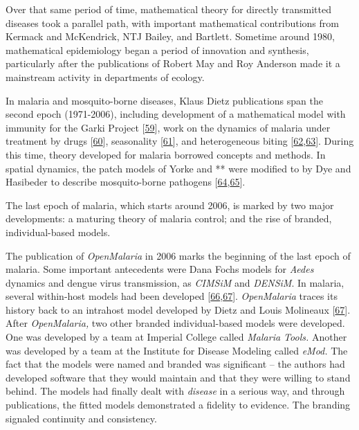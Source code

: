 \documentclass[
]{book}
\begin{document}
Over that same period of time, mathematical theory for directly transmitted diseases took a parallel path, with important mathematical contributions from Kermack and McKendrick, NTJ Bailey, and Bartlett. Sometime around 1980, mathematical epidemiology began a period of innovation and synthesis, particularly after the publications of Robert May and Roy Anderson made it a mainstream activity in departments of ecology.

In malaria and mosquito-borne diseases, Klaus Dietz publications span the second epoch (1971-2006), including development of a mathematical model with immunity for the Garki Project {[}\protect\hyperlink{ref-DietzK1974GarkiModel}{59}{]}, work on the dynamics of malaria under treatment by drugs {[}\protect\hyperlink{ref-DietzK1975ModelsParasitic}{60}{]}, seasonality {[}\protect\hyperlink{ref-DietzK1976Seasonality}{61}{]}, and heterogeneous biting {[}\protect\hyperlink{ref-DietzK1980ModelsVectorborne}{62},\protect\hyperlink{ref-DietzK1988EpidemiologicalModels}{63}{]}. During this time, theory developed for malaria borrowed concepts and methods. In spatial dynamics, the patch models of Yorke and ** were modified to by Dye and Hasibeder to describe mosquito-borne pathogens {[}\protect\hyperlink{ref-DyeC1986PopulationDynamics}{64},\protect\hyperlink{ref-HasibederG1988PopulationDynamics}{65}{]}.

The last epoch of malaria, which starts around 2006, is marked by two major developments: a maturing theory of malaria control; and the rise of branded, individual-based models.

The publication of \emph{OpenMalaria} in 2006 marks the beginning of the last epoch of malaria. Some important antecedents were Dana Fochs models for \emph{Aedes} dynamics and dengue virus transmission, as \emph{CIMSiM} and \emph{DENSiM}. In malaria, several within-host models had been developed {[}\protect\hyperlink{ref-MolineauxL1999ReviewIntrahost}{66},\protect\hyperlink{ref-MolineauxL2001PlasmodiumFalciparum}{67}{]}. \emph{OpenMalaria} traces its history back to an intrahost model developed by Dietz and Louis Molineaux {[}\protect\hyperlink{ref-MolineauxL2001PlasmodiumFalciparum}{67}{]}. After \emph{OpenMalaria,} two other branded individual-based models were developed. One was developed by a team at Imperial College called \emph{Malaria Tools.} Another was developed by a team at the Institute for Disease Modeling called \emph{eMod.} The fact that the models were named and branded was significant -- the authors had developed software that they would maintain and that they were willing to stand behind. The models had finally dealt with \emph{disease} in a serious way, and through publications, the fitted models demonstrated a fidelity to evidence. The branding signaled continuity and consistency.
\end{document}
